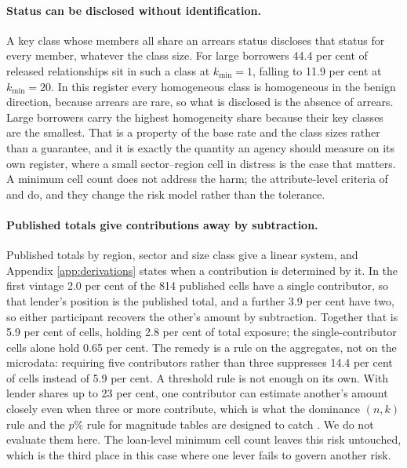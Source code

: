 \documentclass[11pt,a4paper]{article}
\theoremstyle{plain}
\theoremstyle{definition}
\theoremstyle{definition}
\theoremstyle{plain}
\begin{document}
\paragraph{Status can be disclosed without identification.} A key class whose
members all share an arrears status discloses that status for every member,
whatever the class size. For large borrowers 44.4 per cent of released
relationships sit in such a class at $k_{\min} = 1$, falling to 11.9 per cent at
$k_{\min} = 20$. In this register every homogeneous class is homogeneous in the
benign direction, because arrears are rare, so what is disclosed is the absence
of arrears. Large borrowers carry the highest homogeneity share because their key
classes are the smallest. That is a property of the base rate and the class
sizes rather than a guarantee, and it is exactly the quantity an agency should
measure on its own register, where a small sector--region cell in distress is
the case that matters. A minimum cell count does not address the harm; the
attribute-level criteria of \citet{machanavajjhala2007} and \citet{li2007} do,
and they change the risk model rather than the tolerance.

\paragraph{Published totals give contributions away by subtraction.} Published
totals by region, sector and size class give a linear system, and Appendix
\ref{app:derivations} states when a contribution is determined by it. In the
first vintage 2.0 per cent of the 814 published cells have a single contributor,
so that lender's position is the published total, and a further 3.9 per cent
have two, so either participant recovers the other's amount by subtraction.
Together that is 5.9 per cent of cells, holding 2.8 per cent of total exposure;
the single-contributor cells alone hold 0.65 per cent. The remedy is a rule on
the aggregates, not on the microdata: requiring five contributors rather than
three suppresses 14.4 per cent of cells instead of 5.9 per cent. A threshold rule
is not enough on its own. With lender shares up to 23 per cent, one contributor
can estimate another's amount closely even when three or more contribute, which
is what the dominance $(n,k)$ rule and the $p\%$ rule for magnitude tables are
designed to catch \citep[ch.~4]{hundepool2012}. We do not evaluate them here. The
loan-level minimum cell count leaves this risk untouched, which is the third
place in this case where one lever fails to govern another risk.
\end{document}
